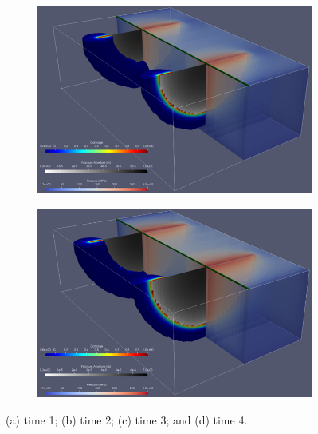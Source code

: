 \begin{figure}[h]
\bigskip
\begin{subfigure}{.45\textwidth}
  \centering
  \includegraphics[width=\linewidth]{Chapter4/figures/3D/t_60.png}
  \caption{}
  \label{fig:parallel_t_2}
\end{subfigure}
\hspace{0.85cm}
\begin{subfigure}{.45\textwidth}
  \centering
  \includegraphics[width=\linewidth]{Chapter4/figures/3D/t_90.png}
  \caption{}
  \label{fig:parallel_t_3}
\end{subfigure}
  \caption{(a) time 1; (b) time 2; (c) time 3; and (d) time 4. } 
  \label{fig:parallel_snapshots}
\end{figure}

